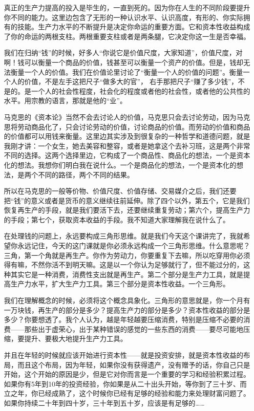 \documentclass[UTF8, 12pt, a4paper]{ctexrep}
\begin{document}
真正的生产力提高的投入是毕生的，一直到死的。因为你在人生的不同阶段要提升你不同的能力。这里边包含了无形的一种认识水平、认识高度，有形的、你实际拥有的技能。生产力水平的不断提升是决定你命运的重要方面。它和资本性收益构成了你的命运的两根支柱。两根重要支柱或者是两条腿，它决定你这一生是否幸福。

我们在归纳“钱”的时候，好多人“你说它是价值尺度，大家知道”，价值尺度，对啊！钱可以衡量一个商品的价值，钱甚至可以衡量一个资产的价值。但是，钱却无法衡量一个人的价值。我们在价值论里讨论了“衡量一个人的价值的问题”。衡量一个人的价值，不是左手这把尺子“做多大的官”， 右手那把尺子“赚了多少钱”，不是的。是一个人的社会性程度，社会化的程度或者他的社会性，或者他的公共性的水平。用宗教的语言，那就是他的“业”。

马克思的《资本论》当然不会去讨论人的价值，马克思只会去讨论劳动，因为马克思将劳动商品化了，只会讨论劳动的价值，讨论商品的价值。而劳动的价值和商品的价值都可以用钱来衡量。这里边其实涉及到很复杂的一种哲学和道德问题，就是我刚才讲：一个女生，她去美容和整容，或者是她拿这个去补习班，这是两个非常不同的选择。这两个选择里边，它构成了一个商品性、商品化的想法，一个是资本化的想法。我想你们明白我在说什么。一个是商品化的想法，一个是资本化的想法，是两个不同的路径，两个不同的结果。

所以在马克思的一般等价物、价值尺度、价值存储、交易媒介之后，我们还要把“钱”的意义或者是货币的意义继续往前延伸。除了四个以外，第五个，它是我们恢复再生产的手段，就是我们要活下去，还要继续重复劳动；第六个，提高生产力的手段；第七个，获取资本收益的手段。我不知道大家理解我在说什么了。

在处理钱的问题上，永远要构成三角形思维。就是我们今天这个课讲完了，我就希望你永远记住，今天的这门课就是你必须永远构成一个三角形思维。什么意思呢？三角，第一个角就是再生产。你作为劳动力，你要重复下去嘛，所以吃穿用你必须得有嘛，不然你活不到明天嘛。这是以一个你认为足够就行了，但不能过分的，这种其实它是一种消费，消费性支出就是再生产。第二个部分是生产力工具，就是提高生产力水平，扩大生产力工具。第三个部分是资本性收益。一个三角形。

我们在理解概念的时候，必须将这个概念具象化。三角形的意思就是，你一个月有一万块钱，再生产的部分是多少？提高生产力的部分是多少？资本性收益的部分是多少？你要想透了。我个人认为，越是年轻越要压缩消费，特别是压缩不必要的消费——那些出于虚荣心，出于某种错误的感觉的一些东西的消费——要尽可能地压缩，要提升、要极大地提升生产力工具。

并且在年轻的时候就应该开始进行资本性——就是投资安排，就是资本性收益的布局，而且这个布局，因为年轻，如果你没有获得遗产，没有赠予的话，你自己只是开始，这个开始的原因是少，但是它对你而言是一个重要的学习和经验积累过程。如果你有5年到10年的投资经验，你如果是从二十出头开始，等你到了三十岁、而立之年，你已经成熟了，这个时候你已经有足够的经验和能力来处理财富问题了。如果你持续二十年到四十岁，三十年到五十岁，应该是有足够的……
\end{document}
